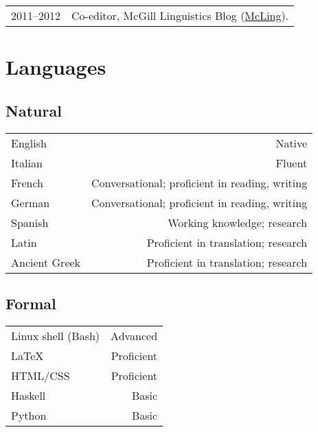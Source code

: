 \documentclass[11pt,letterpaper]{article}
\makeatletter
\newcommand{\formatdatenoday}[2]{\mydatenoday\formatdate{0}{#1}{#2}}
\newcommand{\myvrule}{\color{lightgray}\vrule width 1.0pt}
\newenvironment{cvsection}{%
  \renewcommand{\arraystretch}{1.60}
  \begin{longtable}[l]{@{} L R @{}}
}{%
  \end{longtable}
}
\makeatother
\begin{document}
\begin{cvsection}



  2011--2012 & Co-editor, McGill Linguistics Blog
  (\href{https://blogs.mcgill.ca/mcling/}{McLing}). \\
\end{cvsection}

\section*{Languages}

\vspace{1ex}
\subsection*{Natural}

\begin{cvsection}
  English & Native \\
  Italian & Fluent \\
  French & Conversational; proficient in reading, writing \\
  German & Conversational; proficient in reading, writing \\
  Spanish & Working knowledge; research \\
  Latin & Proficient in translation; research \\
  Ancient Greek & Proficient in translation; research \\
\end{cvsection}

\vspace{-2ex}
\subsection*{Formal}

\begin{cvsection}
  Linux shell {\footnotesize (Bash)} & Advanced \\
  \LaTeX{} & Proficient \\
  HTML/CSS & Proficient \\
  Haskell & Basic \\
  Python & Basic \\
\end{cvsection}
\end{document}
